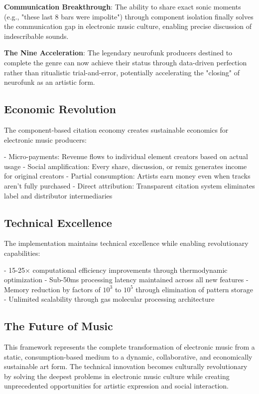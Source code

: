 \documentclass[12pt,a4paper]{article}
\begin{document}
\textbf{Communication Breakthrough}: The ability to share exact sonic moments (e.g., "these last 8 bars were impolite") through component isolation finally solves the communication gap in electronic music culture, enabling precise discussion of indescribable sounds.

\textbf{The Nine Acceleration}: The legendary neurofunk producers destined to complete the genre can now achieve their status through data-driven perfection rather than ritualistic trial-and-error, potentially accelerating the "closing" of neurofunk as an artistic form.

\subsection{Economic Revolution}

The component-based citation economy creates sustainable economics for electronic music producers:

- Micro-payments: Revenue flows to individual element creators based on actual usage
- Social amplification: Every share, discussion, or remix generates income for original creators  
- Partial consumption: Artists earn money even when tracks aren't fully purchased
- Direct attribution: Transparent citation system eliminates label and distributor intermediaries

\subsection{Technical Excellence}

The implementation maintains technical excellence while enabling revolutionary capabilities:

- 15-25× computational efficiency improvements through thermodynamic optimization
- Sub-50ms processing latency maintained across all new features
- Memory reduction by factors of $10^3$ to $10^5$ through elimination of pattern storage
- Unlimited scalability through gas molecular processing architecture

\subsection{The Future of Music}

This framework represents the complete transformation of electronic music from a static, consumption-based medium to a dynamic, collaborative, and economically sustainable art form. The technical innovation becomes culturally revolutionary by solving the deepest problems in electronic music culture while creating unprecedented opportunities for artistic expression and social interaction.
\end{document}
